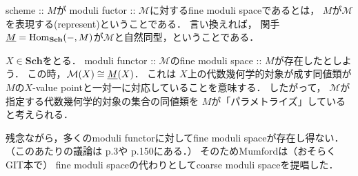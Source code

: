 \documentclass[a4paper]{jsarticle}
\newcommand{\Sch}{\mathbf{Sch}}
\newcommand{\func}[1]{\underline{#1}}
\newcommand{\ftorM}{\mathcal{M}}
\begin{document}
    \begin{Def}
        scheme :: $M$が
        moduli fuctor :: $\ftorM$に対するfine moduli spaceであるとは，
        $M$が$\ftorM$を表現する(represent)ということである．
        言い換えれば，
        関手$\func{M}=\Hom_{\Sch}(-, M)$が$\ftorM$と自然同型，ということである．
    \end{Def}






    \begin{Remark}
        $X \in \Sch$をとる．
        moduli functor :: $\ftorM$のfine moduli space :: $M$が存在したとしよう．
        この時，$\ftorM(X) \iso \func{M}(X)$．
        これは
        $X$上の代数幾何学的対象が成す同値類が
        $M$の$X$-value pointと一対一に対応していることを意味する．
        したがって，
        $\ftorM$が指定する代数幾何学的対象の集合の同値類を
        $M$が「パラメトライズ」していると考えられる．
    \end{Remark}

    残念ながら，多くのmoduli functorに対してfine moduli spaceが存在し得ない．
    （このあたりの議論は\cite{HaMo} p.3や\cite{HarDef} p.150にある．）
    そのためMumfordは（おそらくGIT本で）
    fine moduli spaceの代わりとしてcoarse moduli spaceを提唱した．
\end{document}
